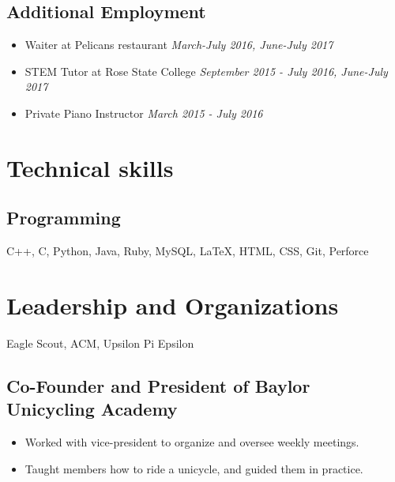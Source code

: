 \documentclass{article}
\begin{document}
\subsection{Additional Employment}
\begin{itemize}
	\itemsep0em
	\item Waiter at Pelicans restaurant \hfill\textit{March-July 2016, June-July 2017} 
	
	\item STEM Tutor at Rose State College \hfill\textit{September 2015 - July 2016, June-July 2017} 
	
	\item Private Piano Instructor \hfill\textit{March 2015 - July 2016}
\end{itemize}

\section{Technical skills}

\subsection{Programming}

C++, C, Python, Java, Ruby, MySQL, {\LaTeX}, HTML, CSS, Git, Perforce

\section{Leadership and Organizations}
Eagle Scout, ACM, Upsilon Pi Epsilon 
\subsection{Co-Founder and President of Baylor Unicycling Academy}
\begin{itemize}
	\itemsep0em
	\item Worked with vice-president to organize and oversee weekly meetings. 
	\item Taught members how to ride a unicycle, and guided them in practice.
\end{itemize}
\noindent
\end{document}
